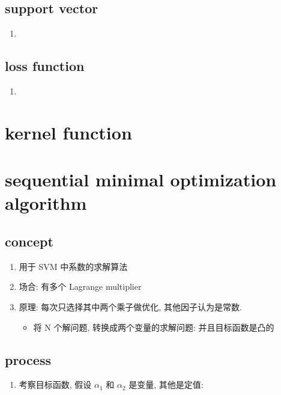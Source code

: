 \documentclass[oneside, 12pt]{ctexbook}
\begin{document}
			\subsection{\quad support vector}
				\begin{enumerate}
					\item 
				\end{enumerate}
			
			\subsection{\quad loss function}
				\begin{enumerate}
					\item
				\end{enumerate}
			
		\section{\quad kernel function}
		
		\section{\quad sequential minimal optimization algorithm}
			\subsection{\quad concept}
				\begin{enumerate}
					\item 用于 SVM 中系数的求解算法
					
					\item 场合: 有多个 Lagrange multiplier
					
					\item 原理: 每次只选择其中两个乘子做优化, 其他因子认为是常数.
						\begin{itemize}
							\item 将 N 个解问题, 转换成两个变量的求解问题: 并且目标函数是凸的
						\end{itemize}
				\end{enumerate}
			
			\subsection{\quad process}
				\begin{enumerate}
					\item 考察目标函数, 假设 $\alpha_1$ 和 $\alpha_2$ 是变量, 其他是定值:
						\begin{align}
							
						\end{align}

				\end{enumerate}
\end{document}
